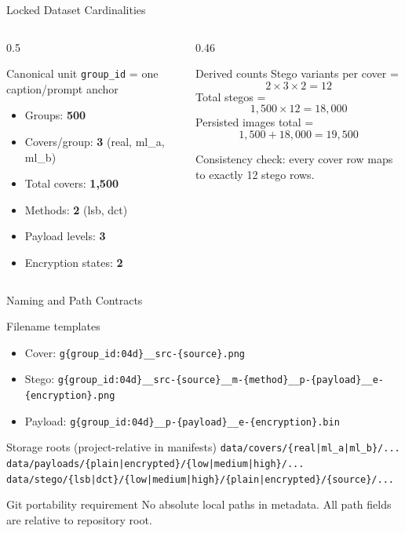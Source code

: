 \documentclass[aspectratio=169,11pt]{beamer}
\begin{document}
\begin{frame}{Locked Dataset Cardinalities}
\small
\begin{columns}[T]
\begin{column}{0.5\textwidth}
\begin{block}{Canonical unit}
\texttt{group\_id} = one caption/prompt anchor
\end{block}
\begin{itemize}
\item Groups: \textbf{500}
\item Covers/group: \textbf{3} (real, ml\_a, ml\_b)
\item Total covers: \textbf{1,500}
\item Methods: \textbf{2} (lsb, dct)
\item Payload levels: \textbf{3}
\item Encryption states: \textbf{2}
\end{itemize}
\end{column}
\begin{column}{0.46\textwidth}
\begin{alertblock}{Derived counts}
\small
Stego variants per cover =
\[
2 \times 3 \times 2 = 12
\]
Total stegos =
\[
1{,}500 \times 12 = 18{,}000
\]
Persisted images total =
\[
1{,}500 + 18{,}000 = 19{,}500
\]
\end{alertblock}
\vspace{-0.1cm}
{\scriptsize Consistency check: every cover row maps to exactly 12 stego rows.}
\end{column}
\end{columns}
\end{frame}

\begin{frame}{Naming and Path Contracts}
\small
\begin{block}{Filename templates}
\begin{itemize}
\item Cover: \texttt{g\{group\_id:04d\}\_\_src-\{source\}.png}
\item Stego: \texttt{g\{group\_id:04d\}\_\_src-\{source\}\_\_m-\{method\}\_\_p-\{payload\}\_\_e-\{encryption\}.png}
\item Payload: \texttt{g\{group\_id:04d\}\_\_p-\{payload\}\_\_e-\{encryption\}.bin}
\end{itemize}
\end{block}

\begin{block}{Storage roots (project-relative in manifests)}
\scriptsize
\texttt{data/covers/\{real|ml\_a|ml\_b\}/...}\\
\texttt{data/payloads/\{plain|encrypted\}/\{low|medium|high\}/...}\\
\texttt{data/stego/\{lsb|dct\}/\{low|medium|high\}/\{plain|encrypted\}/\{source\}/...}
\end{block}

\begin{alertblock}{Git portability requirement}
No absolute local paths in metadata. All path fields are relative to repository root.
\end{alertblock}
\end{frame}
\end{document}
